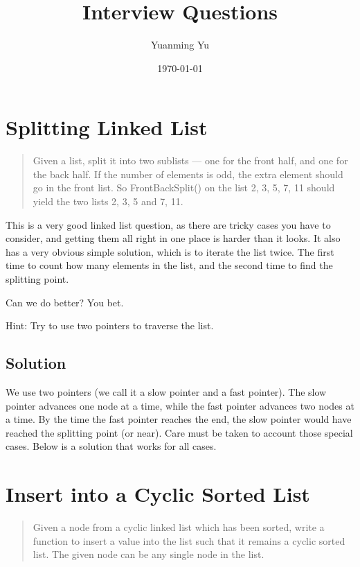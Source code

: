 \documentclass[12pt, reqno, oneside]{amsart}
\title{Interview Questions}
\author{Yuanming Yu}
\date{\today}  %
\begin{document}
\maketitle
\tableofcontents


\section{Splitting Linked List}
\begin{framed}
\begin{quote}
Given a list, split it into two sublists — one for the front half, and one for the back half. If the number of elements is odd, the extra element should go in the front list. So FrontBackSplit() on the list {2, 3, 5, 7, 11} should yield the two lists {2, 3, 5} and {7, 11}.
\end{quote}
\end{framed}

This is a very good linked list question, as there are tricky cases you have to consider, and getting them all right in one place is harder than it looks. It also has a very obvious simple solution, which is to iterate the list twice. The first time to count how many elements in the list, and the second time to find the splitting point.

Can we do better? You bet.

Hint: Try to use two pointers to traverse the list.

\subsection{Solution}
We use two pointers (we call it a slow pointer and a fast pointer). The slow pointer advances one node at a time, while the fast pointer advances two nodes at a time. By the time the fast pointer reaches the end, the slow pointer would have reached the splitting point (or near). Care must be taken to account those special cases. Below is a solution that works for all cases.



\section{Insert into a Cyclic Sorted List}
\begin{framed}
\begin{quotation}
Given a node from a cyclic linked list which has been sorted, write a function to insert a value into the list such that it remains a cyclic sorted list. The given node can be any single node in the list.
\end{quotation}
\end{framed}
\end{document}
